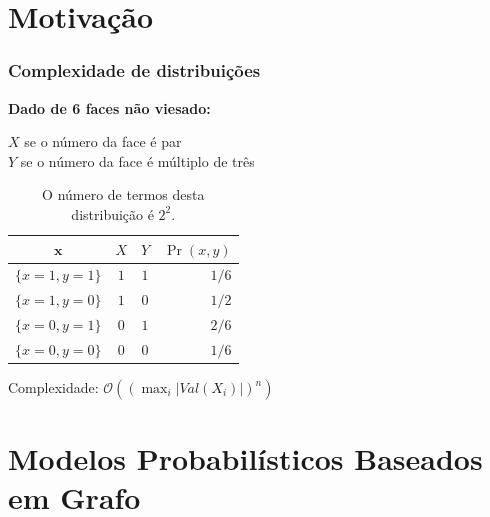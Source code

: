 \documentclass[10pt]{beamer}
\theoremstyle{plain}
\newcommand{\set}[1]{\mathbf{#1}}
\newcommand{\bigo}{\mathcal{O}}
\begin{document}
\section{Motivação}
\begingroup
\tiny
\begin{frame}
  \frametitle{Complexidade de distribuições}

  \begin{example}
    \textbf{Dado de 6 faces não viesado:}

    $X$ se o número da face é par\\
    $Y$ se o número da face é múltiplo de três

    \begin{table}[h]
      \begin{center}
        \begin{tabular}{c | c c | r}
          $\set{x}$ & $X$ & $Y$ & $\Pr(x, y)$ \\
          \hline
          $\{x=1,y=1\}$ & $1$ & $1$ & $1/6$ \\
          $\{x=1,y=0\}$ & $1$ & $0$ & $1/2$ \\
          $\{x=0,y=1\}$ & $0$ & $1$ & $2/6$ \\
          $\{x=0,y=0\}$ & $0$ & $0$ & $1/6$ \\
        \end{tabular}
        \captionsetup{font=scriptsize}
        \caption*{\scriptsize O número de termos desta distribuição é $2^2$.}
      \end{center}
    \end{table}

    Complexidade: $\bigo((\max_i |Val(X_i)|)^n)$
  \end{example}
\end{frame}
\endgroup


\section[PGMs]{Modelos Probabilísticos Baseados em Grafo}
\end{document}

